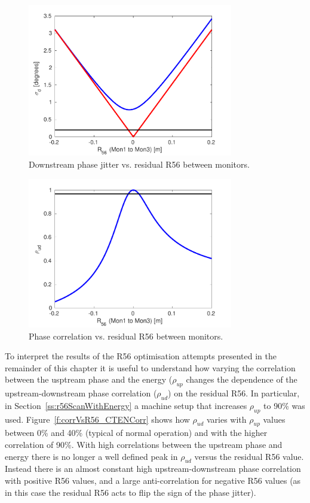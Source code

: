 \begin{figure}
  \centering
  \includegraphics[width=0.8\textwidth]{Figures/propagation/jitVsR56}
  \caption{Downstream phase jitter vs. residual R56 between monitors.}
  \label{f:jitVsR56}
\end{figure}

\begin{figure}
  \centering
  \includegraphics[width=0.8\textwidth]{Figures/propagation/corrVsR56}
  \caption{Phase correlation vs. residual R56 between monitors.}
  \label{f:corrVsR56}
\end{figure}

To interpret the results of the R56 optimisation attempts presented in the remainder of this chapter it is useful to understand how varying the correlation between the usptream phase and the energy (\(\rho_{up}\) changes the dependence of the upstream-downstream phase correlation (\(\rho_{ud}\)) on the residual R56. In particular, in Section~\ref{ss:r56ScanWithEnergy} a machine setup that increases \(\rho_{up}\) to 90\% was used. Figure~\ref{f:corrVsR56_CTENCorr} shows how \(\rho_{ud}\) varies with \(\rho_{up}\) values between 0\% and 40\% (typical of normal operation) and with the higher correlation of 90\%. With high correlations between the upstream phase and energy there is no longer a well defined peak in \(\rho_{ud}\) versus the residual R56 value. Instead there is an almost constant high upstream-downstream phase correlation with positive R56 values, and a large anti-correlation for negative R56 values (as in this case the residual R56 acts to flip the sign of the phase jitter). 

